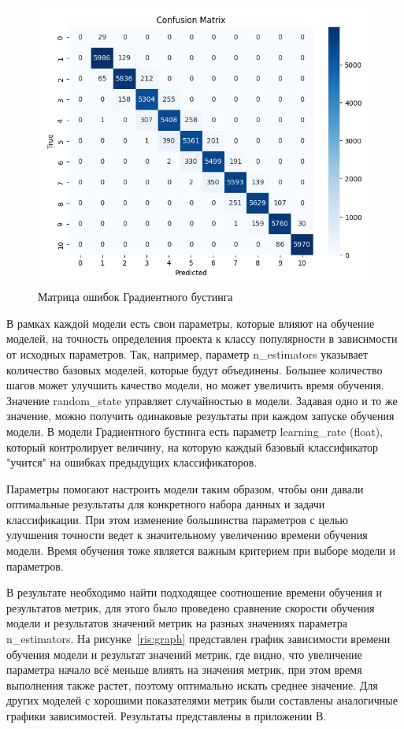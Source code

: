 \begin{figure}[h]
    \centering
    \includegraphics[width=0.9\linewidth]{pic/classification/gradient_boosting.png}
    \vspace{0.5em}\caption{Матрица ошибок Градиентного бустинга}
    \label{ris:class}
\end{figure}
\vspace{1em}

В рамках каждой модели есть свои параметры, которые влияют на обучение моделей, на точность определения проекта к классу популярности в зависимости от исходных параметров. Так, например, параметр n\_estimators указывает количество базовых моделей, которые будут объединены. Большее количество шагов может улучшить качество модели, но может увеличить время обучения. Значение random\_state управляет случайностью в модели. Задавая одно и то же значение, можно получить одинаковые результаты при каждом запуске обучения модели. В модели Градиентного бустинга есть параметр learning\_rate (float), который контролирует величину, на которую каждый базовый классификатор "учится" на ошибках предыдущих классификаторов.

Параметры помогают настроить модели таким образом, чтобы они давали оптимальные результаты для конкретного набора данных и задачи классификации. При этом изменение большинства параметров с целью улучшения точности ведет к значительному увеличению времени обучения модели. Время обучения тоже является важным критерием при выборе модели и параметров. 

В результате необходимо найти подходящее соотношение времени обучения и результатов метрик, для этого было проведено сравнение скорости обучения модели и результатов значений метрик на разных значениях параметра n\_estimators. На рисунке~\ref{ris:graph} представлен график зависимости времени обучения модели и результат значений метрик, где видно, что увеличение параметра начало всё меньше влиять на значения метрик, при этом время выполнения также растет, поэтому оптимально искать среднее значение. Для других моделей с хорошими показателями метрик были составлены аналогичные графики зависимостей. Результаты представлены в приложении В. 

